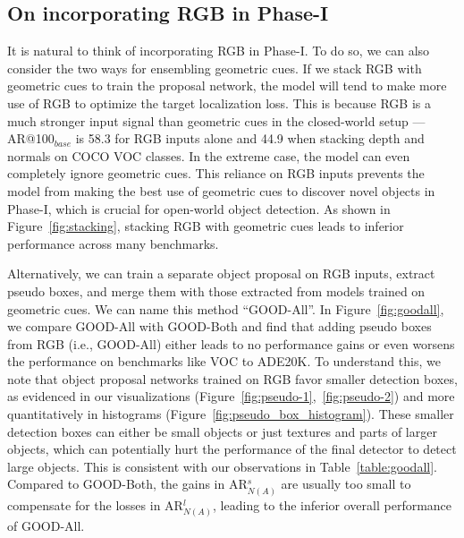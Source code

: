 \documentclass{article} \usepackage{iclr2023_conference,times}
\begin{document}
\subsection{On incorporating RGB in Phase-I}
It is  natural to think of incorporating RGB in Phase-I. 
To do so, we can also consider the two ways for ensembling geometric cues.
If we stack RGB with geometric cues to train the proposal network, the model will tend to make more use of RGB to optimize the target localization loss. This is because RGB is a much stronger input signal than geometric cues in the closed-world setup — AR@100$_{base}$ is 58.3 for RGB inputs alone and 44.9 when stacking depth and normals on COCO VOC classes. In the extreme case, the model can even completely ignore geometric cues. This reliance on RGB inputs prevents the model from making the best use of geometric cues to discover novel objects in Phase-I, which is crucial for open-world object detection.
As shown in Figure~\ref{fig:stacking}, stacking RGB with geometric cues leads to inferior performance across many benchmarks.

Alternatively, we can train a separate object proposal on RGB inputs, extract pseudo boxes, and merge them with those extracted from models trained on geometric cues. We can name this method ``GOOD-All''. In Figure~\ref{fig:goodall}, we compare GOOD-All with GOOD-Both and find that adding pseudo boxes from RGB (i.e., GOOD-All) either leads to no performance gains or even worsens the performance on benchmarks like VOC to ADE20K. To understand this, we note that object proposal networks trained on RGB favor smaller detection boxes, as evidenced in our visualizations (Figure~\ref{fig:pseudo-1},~\ref{fig:pseudo-2}) and more quantitatively in histograms (Figure~\ref{fig:pseudo_box_histogram}). These smaller detection boxes can either be small objects or just textures and parts of larger objects, which can potentially hurt the performance of the final detector to detect large objects. This is consistent with our observations in Table~\ref{table:goodall}. Compared to GOOD-Both, the gains in AR$_{N(A)}^s$ are usually too small to compensate for the losses in AR$_{N(A)}^l$, leading to the inferior overall performance of GOOD-All.
\end{document}
